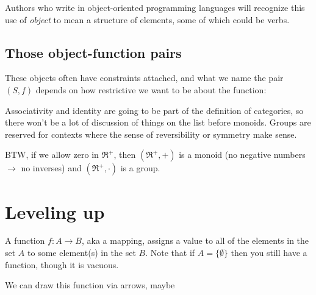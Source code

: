 \documentclass[11pt]{article}
\begin{document}
Authors who write in object-oriented programming languages will recognize this
use of {\em object} to mean a structure of elements, some of which could be verbs.

\subsection{Those object-function pairs}
These objects often have constraints attached, and what we name the pair $(S, f)$ depends on
how restrictive we want to be about the function:


Associativity and identity are going to be part of the definition of categories,
so there won't be a lot of discussion of things on the list before monoids.
Groups are reserved for contexts where the sense of reversibility or symmetry make sense.

BTW, if we allow zero in $\Re^+$, then $(\Re^+, +)$ is a monoid (no negative numbers
$\rightarrow$ no inverses) and $(\Re^+, \cdot)$ is a group.

\section{Leveling up}\label{levelsec}

A function $f:A\to B$, aka a mapping, assigns a value to all of the elements in the set $A$ to
some element(s) in the set $B$. Note that if $A=\{\emptyset\}$ then you still have a function, though
it is vacuous.

We can draw this function via arrows, maybe

\begin{center}
\end{center}
\end{document}
